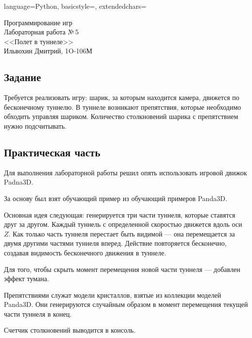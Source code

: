 \documentclass[12pt]{article}
\newcommand{\StudentName}{Ильвохин Дмитрий}
\newcommand{\Group}{1O-106М}
\newcommand{\CourseName}{Программирование игр}
\newcommand{\LabNum}{5}
\newcommand{\Subject}{Полет в туннеле}
\begin{document}

\lstset
{
        language=Python,
        basicstyle=\footnotesize,%
        extendedchars=\true
}

\begin{flushright}
\Large{
	\CourseName \\
	Лабораторная работа №\,\LabNum \\
	<<\Subject>> \\
  \StudentName, \Group \\
}
\end{flushright}

\subsection*{Задание}
Требуется реализовать игру: шарик, за которым находится камера, движется
по бесконечному туннелю. В туннеле возникают препятствия, которые необходимо
обходить управляя шариком. Количество столкновений шарика с препятствием
нужно подсчитывать.

\subsection*{Практическая часть}
Для выполнения лабораторной работы решил опять использовать
игровой движок Padna3D.

За основу был взят обучающий пример из обучающий примеров Panda3D.

Основная идея следующая: генерируется три части туннеля, которые ставятся друг
за другом. Каждый туннель с определенной скоростью движется вдоль оси $Z$.
Как только часть туннеля перестает быть видимой --- она перемещается за двумя другими
частями туннеля вперед. Действие повторяется бесконечно, создавая видимость бесконечного
движения в туннеле.

Для того, чтобы скрыть момент перемещения новой части туннеля --- добавлен эффект тумана.

Препятствиями служат модели кристаллов, взятые из коллекции моделей Panda3D.
Они генерируются случайным образом в момент перемещения текущей части туннеля в конец.

Счетчик столкновений выводится в консоль.
\end{document}
